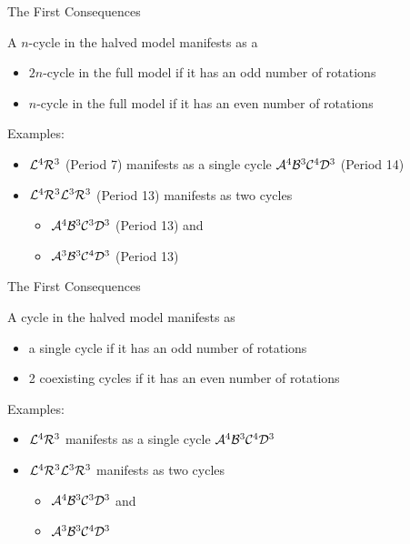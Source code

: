 \begin{frame}{The First Consequences}
	\begin{theorem}
		A $n$-cycle in the halved model manifests as a
		\begin{itemize}
			\item $2n$-cycle in the full model if it has an odd number of rotations
			\item $n$-cycle in the full model if it has an even number of rotations
		\end{itemize}
	\end{theorem}
	\pause
	Examples:
	\begin{itemize}
		\item $\mathcal{L}^4\mathcal{R}^3$ (Period 7) manifests as a single cycle $\mathcal{A}^4\mathcal{B}^3\mathcal{C}^4\mathcal{D}^3$ (Period 14)
		\item $\mathcal{L}^4\mathcal{R}^3\mathcal{L}^3\mathcal{R}^3$ (Period 13) manifests as two cycles
		      \begin{itemize}
			      \item $\mathcal{A}^4\mathcal{B}^3\mathcal{C}^3\mathcal{D}^3$ (Period 13) and
			      \item $\mathcal{A}^3\mathcal{B}^3\mathcal{C}^4\mathcal{D}^3$ (Period 13)
		      \end{itemize}
	\end{itemize}
\end{frame}

\begin{frame}{The First Consequences}
	\begin{theorem}
		A cycle in the halved model manifests as
		\begin{itemize}
			\item a single cycle if it has an odd number of rotations
			\item 2 coexisting cycles if it has an even number of rotations
		\end{itemize}
	\end{theorem}
	\pause
	Examples:
	\begin{itemize}
		\item $\mathcal{L}^4\mathcal{R}^3$ manifests as a single cycle $\mathcal{A}^4\mathcal{B}^3\mathcal{C}^4\mathcal{D}^3$
		\item $\mathcal{L}^4\mathcal{R}^3\mathcal{L}^3\mathcal{R}^3$ manifests as two cycles
		      \begin{itemize}
			      \item $\mathcal{A}^4\mathcal{B}^3\mathcal{C}^3\mathcal{D}^3$ and
			      \item $\mathcal{A}^3\mathcal{B}^3\mathcal{C}^4\mathcal{D}^3$
		      \end{itemize}
	\end{itemize}
\end{frame}

